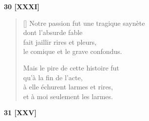 \documentclass[a4paper,12pt]{book}
\begin{document}
\bigskip

\begin{center}
  \textbf{30 [XXXI]}
\end{center}

\settowidth{\versewidth}{Notre passion fut une tragique saynète}

\begin{verse}[\versewidth]
  Notre passion fut une tragique saynète \\
  dont l'absurde fable \\
  fait jaillir rires et pleurs, \\
  le comique et le grave confondus.

  Mais le pire de cette histoire fut \\
  qu'à la fin de l'acte, \\
  à elle échurent larmes et rires, \\
  et à moi seulement les larmes.
\end{verse}

\bigskip

\begin{center}
  \textbf{31 [XXV]}
\end{center}

\settowidth{\versewidth}{Quand t'enveloppent dans la nuit}
\end{document}
